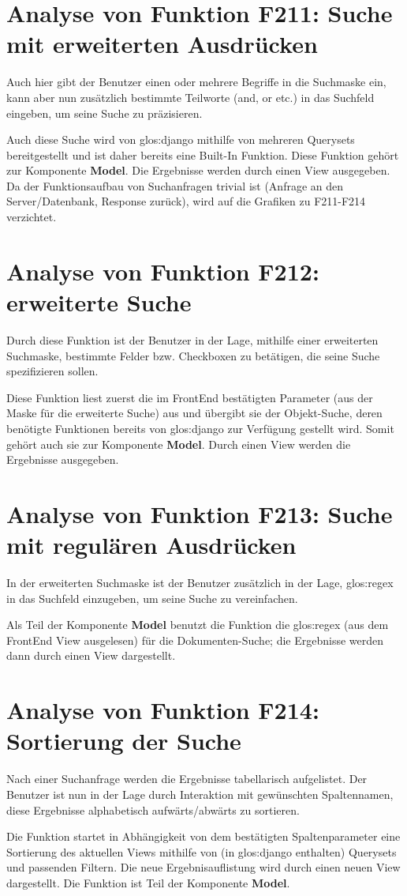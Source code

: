 \section{Analyse von Funktion F211: Suche mit erweiterten Ausdrücken}
Auch hier gibt der Benutzer einen oder mehrere Begriffe in die Suchmaske ein, kann aber nun zusätzlich bestimmte Teilworte (and, or etc.) in das Suchfeld eingeben, um seine Suche zu präzisieren.  

Auch diese Suche wird von \gls{glos:django} mithilfe von mehreren Querysets bereitgestellt und ist daher bereits eine Built-In Funktion. Diese Funktion gehört zur Komponente \textbf{Model}. Die Ergebnisse werden durch einen View ausgegeben. 
Da der Funktionsaufbau von Suchanfragen trivial ist (Anfrage an den Server/Datenbank, Response zurück), wird auf die Grafiken zu F211-F214 verzichtet.   

\section{Analyse von Funktion F212: erweiterte Suche}
Durch diese Funktion ist der Benutzer in der Lage, mithilfe einer erweiterten Suchmaske, bestimmte Felder bzw. Checkboxen zu betätigen, die seine Suche spezifizieren sollen.
    
Diese Funktion liest zuerst die im FrontEnd bestätigten Parameter (aus der Maske für die erweiterte Suche) aus und übergibt sie der Objekt-Suche, deren benötigte Funktionen bereits von \gls{glos:django} zur Verfügung gestellt wird. Somit gehört auch sie zur Komponente \textbf{Model}. Durch einen View werden die Ergebnisse ausgegeben. 

\section{Analyse von Funktion F213: Suche mit regulären Ausdrücken}
In der erweiterten Suchmaske ist der Benutzer zusätzlich in der Lage, \gls{glos:regex} in das Suchfeld einzugeben, um seine Suche zu vereinfachen. 

Als Teil der Komponente \textbf{Model} benutzt die Funktion die \gls{glos:regex} (aus dem FrontEnd View ausgelesen) für die Dokumenten-Suche; die Ergebnisse werden dann durch einen View dargestellt.
 
\section{Analyse von Funktion F214: Sortierung der Suche}
Nach einer Suchanfrage werden die Ergebnisse tabellarisch aufgelistet. Der Benutzer ist nun in der Lage durch Interaktion mit gewünschten Spaltennamen, diese Ergebnisse alphabetisch aufwärts/abwärts zu sortieren. 

Die Funktion startet in Abhängigkeit von dem bestätigten Spaltenparameter eine Sortierung des aktuellen Views mithilfe von (in \gls{glos:django} enthalten) Querysets und passenden Filtern. Die neue Ergebnisauflistung wird durch einen neuen View dargestellt. Die Funktion ist Teil der Komponente \textbf{Model}. 




 